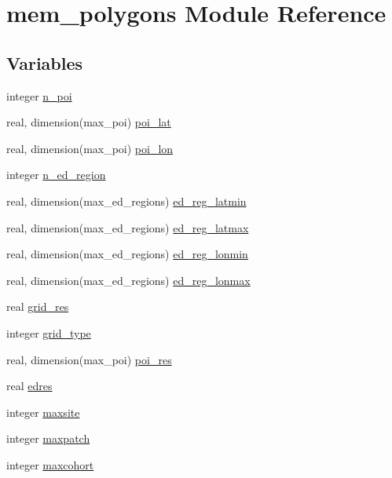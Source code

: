 \hypertarget{namespacemem__polygons}{}\section{mem\+\_\+polygons Module Reference}
\label{namespacemem__polygons}
\subsection*{Variables}
\begin{DoxyCompactItemize}
\item 
integer \hyperlink{namespacemem__polygons_a40cfdce95dfd1bde88dfdc7e2aa9c667}{n\+\_\+poi}
\item 
real, dimension(max\+\_\+poi) \hyperlink{namespacemem__polygons_acf0a86c4cebdaacd2344c2af339605a3}{poi\+\_\+lat}
\item 
real, dimension(max\+\_\+poi) \hyperlink{namespacemem__polygons_aa70b00dd2ead0ce3911b4d7bed6e5212}{poi\+\_\+lon}
\item 
integer \hyperlink{namespacemem__polygons_aff9e65847e5c49e661181c4eaeee87f9}{n\+\_\+ed\+\_\+region}
\item 
real, dimension(max\+\_\+ed\+\_\+regions) \hyperlink{namespacemem__polygons_ab616081d94da98469edf2f12dd30dfa9}{ed\+\_\+reg\+\_\+latmin}
\item 
real, dimension(max\+\_\+ed\+\_\+regions) \hyperlink{namespacemem__polygons_afef0110728dd37e2b92f68741ed5d74a}{ed\+\_\+reg\+\_\+latmax}
\item 
real, dimension(max\+\_\+ed\+\_\+regions) \hyperlink{namespacemem__polygons_ad6aad9f40e9c8b83f5e606b80a765189}{ed\+\_\+reg\+\_\+lonmin}
\item 
real, dimension(max\+\_\+ed\+\_\+regions) \hyperlink{namespacemem__polygons_a333a8ea32bddc741bc03c089a0159e8d}{ed\+\_\+reg\+\_\+lonmax}
\item 
real \hyperlink{namespacemem__polygons_a8e7ef3eae774f6608d51a357e9fb36c0}{grid\+\_\+res}
\item 
integer \hyperlink{namespacemem__polygons_a277c4afc75feb5def72f823129129b2b}{grid\+\_\+type}
\item 
real, dimension(max\+\_\+poi) \hyperlink{namespacemem__polygons_abc1cd4ebde7513a27a637c90ac77477a}{poi\+\_\+res}
\item 
real \hyperlink{namespacemem__polygons_a73d1841f5ed2548669ab194d7c34a6e9}{edres}
\item 
integer \hyperlink{namespacemem__polygons_a6ea7e4cae77c3cdabf5313950a022aa1}{maxsite}
\item 
integer \hyperlink{namespacemem__polygons_a5ae9a33638a3c06042a5de43390a9f76}{maxpatch}
\item 
integer \hyperlink{namespacemem__polygons_a687ac81b378f4f880e80ce0b186bc6c5}{maxcohort}
\end{DoxyCompactItemize}



